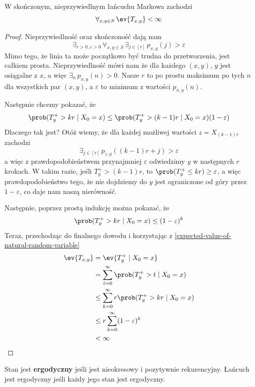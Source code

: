 \begin{theorem}
	W skończonym, nieprzywiedlnym łańcuchu Markowa zachodzi
	\[
		\forall_{x, y \in S} \, \ev{T_{x, y}} < \infty
	\]
\end{theorem}
\begin{proof}
	Nieprzywiedlność oraz skończoność dają nam
	\[
		\exists_{r > 0, \varepsilon > 0} \, \forall_{x, y \in S} \, \exists_{j \in [r]} \, p_{x, y}(j) > \varepsilon
	\]
	Mimo tego, że linia ta może początkowo być trudna do przetworzenia, jest całkiem prosta. Nieprzywiedlność mówi nam że dla każdego \((x, y)\), \(y\) jest osiągalne z \(x\), a więc \(\exists_n \, p_{x, y}(n) > 0\). Nasze \(r\) to po prostu maksimum po tych \(n\) dla wszystkich par \((x, y)\), a \(\varepsilon\) to minimum z wartości \(p_{x, y}(n)\).
	
	Następnie chcemy pokazać, że
	\[
		\prob(T_y^+ > kr \mid X_0 = x) \leq \prob(T_y^+ > (k - 1)r \mid X_0 = x)(1 - \varepsilon)
	\]
	Dlaczego tak jest? Otóż wiemy, że dla każdej możliwej wartości \(z = X_{(k-1)r}\) zachodzi 
	\[
		\exists_{j \in [r]} \, p_{z, y}((k - 1)r + j) > \varepsilon
	\]
	a więc z prawdopodobieństwem przynajmniej \(\varepsilon\) odwiedzimy \(y\) w następnych \(r\) krokach. W takim razie, jeśli \(T_y^+ > (k-1)r\), to \(\prob(T_y^+ \leq kr) \geq \varepsilon\), a więc prawdopodobieństwo tego, że nie dojdziemy do \(y\) jest ograniczone od góry przez \(1 - \varepsilon\), co daje nam naszą nierówność.
	
	Następnie, poprzez prostą indukcję można pokazać, że
	\[
		\prob(T_y^+ > kr \mid X_0 = x) \leq (1 - \varepsilon)^k
	\]
	Teraz, przechodząc do finalnego dowodu i korzystając z \ref{expected-value-of-natural-random-variable}
	\begin{align*}
		\ev{T_{x, y}} &= \ev{T_y^+ \mid X_0 = x}\\
		&= \sum_{t = 0}^\infty \prob(T_y^+ > t \mid X_0 = x)\\
		&\leq \sum_{k = 0}^\infty r \prob(T_y^+ > kr \mid X_0 = x)\\
		&\leq r \sum_{k = 0}^\infty (1 - \varepsilon)^k \\
		&< \infty
    \end{align*}
\end{proof}

\begin{definition}
	Stan jest \textbf{ergodyczny} jeśli jest nieokresowy i pozytywnie rekurencyjny.
	Łańcuch jest ergodyczny jeśli każdy jego stan jest ergodyczny.
\end{definition}

